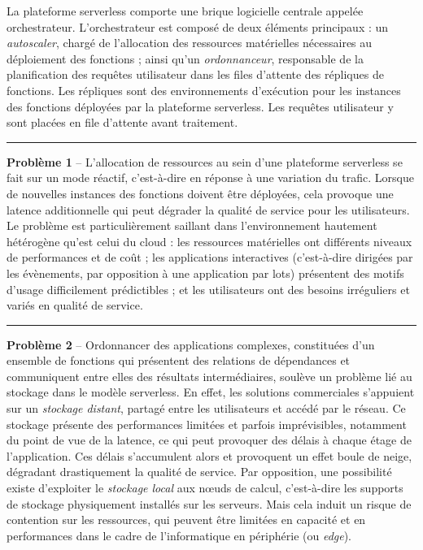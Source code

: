 La plateforme serverless comporte une brique logicielle centrale appelée orchestrateur. L'orchestrateur est composé de deux éléments principaux : un \textit{autoscaler}, chargé de l'allocation des ressources matérielles nécessaires au déploiement des fonctions ; ainsi qu'un \textit{ordonnanceur}, responsable de la planification des requêtes utilisateur dans les files d'attente des répliques de fonctions. Les répliques sont des environnements d'exécution pour les instances des fonctions déployées par la plateforme serverless. Les requêtes utilisateur y sont placées en file d'attente avant traitement.

\clearpage

\begin{center}
    \rule{4cm}{0.4pt}
\end{center}

\textbf{Problème 1} -- L'allocation de ressources au sein d'une plateforme serverless se fait sur un mode réactif, c'est-à-dire en réponse à une variation du trafic. Lorsque de nouvelles instances des fonctions doivent être déployées, cela provoque une latence additionnelle qui peut dégrader la qualité de service pour les utilisateurs. Le problème est particulièrement saillant dans l'environnement hautement hétérogène qu'est celui du cloud : les ressources matérielles ont différents niveaux de performances et de coût ; les applications interactives (c'est-à-dire dirigées par les évènements, par opposition à une application par lots) présentent des motifs d'usage difficilement prédictibles ; et les utilisateurs ont des besoins irréguliers et variés en qualité de service.


\begin{center}
    \rule{4cm}{0.4pt}
\end{center}

\textbf{Problème 2} -- Ordonnancer des applications complexes, constituées d'un ensemble de fonctions qui présentent des relations de dépendances et communiquent entre elles des résultats intermédiaires, soulève un problème lié au stockage dans le modèle serverless. En effet, les solutions commerciales s'appuient sur un \textit{stockage distant}, partagé entre les utilisateurs et accédé par le réseau. Ce stockage présente des performances limitées et parfois imprévisibles, notamment du point de vue de la latence, ce qui peut provoquer des délais à chaque étage de l'application. Ces délais s'accumulent alors et provoquent un effet boule de neige, dégradant drastiquement la qualité de service. Par opposition, une possibilité existe d'exploiter le \textit{stockage local} aux nœuds de calcul, c'est-à-dire les supports de stockage physiquement installés sur les serveurs. Mais cela induit un risque de contention sur les ressources, qui peuvent être limitées en capacité et en performances dans le cadre de l'informatique en périphérie (ou \textit{edge}).

